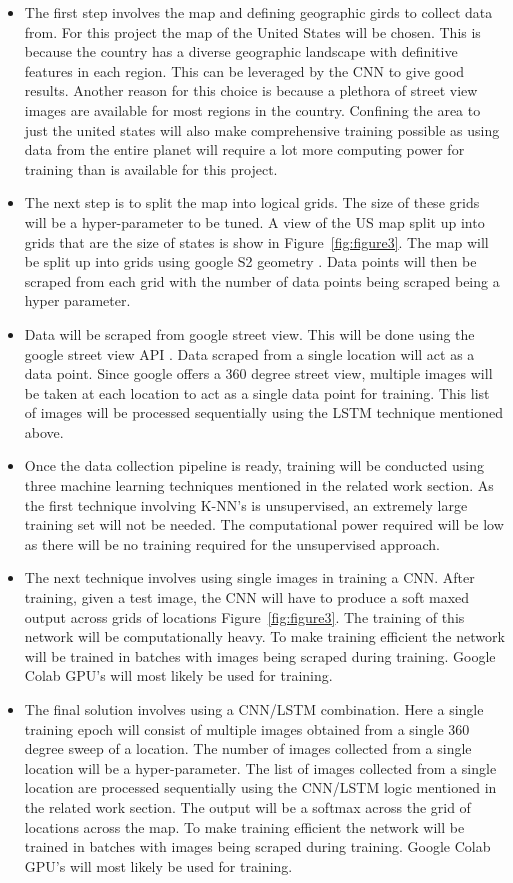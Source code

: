 \documentclass{sigchi}
\begin{document}
 \begin{itemize}
    \item The first step involves the map and defining geographic girds to collect data from. For this project the map of the United States will be chosen. This is because the country has a diverse geographic landscape with definitive features in each region. This can be leveraged by the CNN to give good results. Another reason for this choice is because a plethora of street view images are available for most regions in the country. Confining the area to just the united states will also make comprehensive training possible as using data from the entire planet will require a lot more computing power for training than is available for this project.
    \item The next step is to split the map into logical grids. The size of these grids will be a hyper-parameter to be tuned. A view of the US map split up into grids that are the size of states is show in Figure~\ref{fig:figure3}. The map will be split up into grids using google S2 geometry \cite{S2-geometry:Online}. Data points will then be scraped from each grid with the number of data points being scraped being a hyper parameter.
     \item Data will be scraped from google street view. This will be done using the google street view API \cite{Google-Street-veiw:Online}. Data scraped from a single location will act as a data point. Since google offers a 360 degree street view, multiple images will be taken at each location to act as a single data point for training. This list of images will be processed sequentially using the LSTM technique mentioned above.
     \item Once the data collection pipeline is ready, training will be conducted using three machine learning techniques mentioned in the related work section. As the first technique involving K-NN's is unsupervised, an extremely large training set will not be needed. The computational power required will be low as there will be no training required for the unsupervised approach. 
     \item The next technique involves using single images in  training a CNN. After training, given a test image, the CNN will have to produce a soft maxed output across grids of locations Figure~\ref{fig:figure3}. The training of this network will be computationally heavy. To make training efficient the network will be trained in batches with images being scraped during training. Google Colab GPU's will most likely be used for training.
      \item The final solution involves using a CNN/LSTM combination. Here a single training epoch will consist of multiple images obtained from a single 360 degree sweep of a location. The number of images collected from a single location will be a hyper-parameter. The list of images collected from a single location are processed sequentially using the CNN/LSTM logic mentioned in the related work section. The output will be a softmax across the grid of locations across the map. To make training efficient the network will be trained in batches with images being scraped during training. Google Colab GPU's will most likely be used for training.
 \end{itemize}
\end{document}
